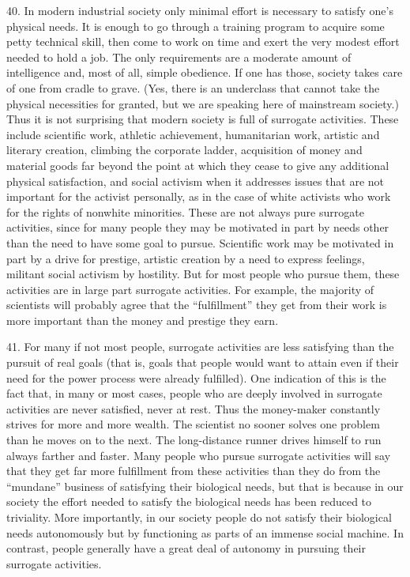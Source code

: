 \documentclass{article}
\begin{document}
40.  In  modern  industrial  society  only  minimal  effort  is  necessary  to  satisfy  one’s  physical  
needs.  It is enough to go through a training program to acquire some petty technical skill, then 
come to work on time and exert the very modest effort needed to hold a job.  The only requirements 
are a moderate amount of intelligence and, most of all, simple obedience.  If one has those, society 
takes care of one from cradle to grave.  (Yes, there is an underclass that cannot take the physical 
necessities for granted, but we are speaking here of mainstream society.) Thus it is not surprising 
that  modern  society  is  full  of  surrogate  activities.   These  include  scientific  work,  athletic  
achievement,  humanitarian  work,  artistic  and  literary  creation,  climbing  the  corporate  ladder,  
acquisition  of  money  and  material  goods  far  beyond  the  point  at  which  they  cease  to  give  any  
additional physical satisfaction, and social activism when it addresses issues that are not important 
for the activist personally, as in the case of white activists who work for the rights of nonwhite 
minorities.   These  are  not  always  pure  surrogate  activities,  since  for  many  people  they  may  be  
motivated in part by needs other than the need to have some goal to pursue.  Scientific work may 
be motivated in part by a drive for prestige, artistic creation by a need to express feelings, militant 
social activism by hostility.  But for most people who pursue them, these activities are in large part 
surrogate activities.  For example, the majority of scientists will probably agree that the 
“fulfillment” they get from their work is more important than the money and prestige they earn. \vspace{\baselineskip}

41.  For  many  if  not  most  people,  surrogate  activities  are  less  satisfying  than  the  pursuit  of  real  
goals (that is, goals that people would want to attain even if their need for the power process were 
already fulfilled).  One indication of this is the fact that, in many or most cases, people who are 
deeply involved in surrogate activities are never satisfied, never at rest.  Thus the money-maker 
constantly strives for more and more wealth.  The scientist no sooner solves one problem than he 
moves  on  to  the  next.   The  long-distance  runner  drives  himself  to  run  always  farther  and  
faster.   Many  people  who  pursue  surrogate  activities  will  say  that  they  get  far  more  fulfillment  
from these activities than they do from the “mundane” business of satisfying their biological needs, 
but that is because in our society the effort needed to satisfy the biological needs has been reduced 
to  triviality.   More  importantly,  in  our  society  people  do  not  satisfy  their  biological  needs  
autonomously  but  by  functioning  as  parts  of  an  immense  social  machine.   In  contrast,  people  
generally have a great deal of autonomy in pursuing their surrogate activities. 
\end{document}
